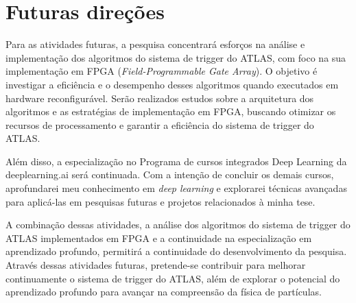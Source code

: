 \section{Futuras direções}\label{cap:futuro}

Para as atividades futuras, a pesquisa concentrará esforços na análise e implementação dos algoritmos do sistema de trigger do ATLAS, com foco na sua implementação em FPGA (\textit{Field-Programmable Gate Array}). O objetivo é investigar a eficiência e o desempenho desses algoritmos quando executados em hardware reconfigurável. Serão realizados estudos sobre a arquitetura dos algoritmos e as estratégias de implementação em FPGA, buscando otimizar os recursos de processamento e garantir a eficiência do sistema de trigger do ATLAS.

Além disso, a especialização no Programa de cursos integrados Deep Learning da deeplearning.ai será continuada. Com a intenção de concluir os demais cursos, aprofundarei meu conhecimento em \textit{deep learning} e explorarei técnicas avançadas para aplicá-las em pesquisas futuras e projetos relacionados à minha tese.

A combinação dessas atividades, a análise dos algoritmos do sistema de trigger do ATLAS implementados em FPGA e a continuidade na especialização em aprendizado profundo, permitirá a continuidade do desenvolvimento da pesquisa. Através dessas atividades futuras, pretende-se contribuir para melhorar continuamente o sistema de trigger do ATLAS, além de explorar o potencial do aprendizado profundo para avançar na compreensão da física de partículas.














